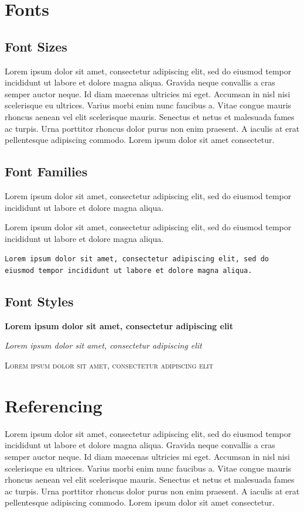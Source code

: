 \documentclass[a4paper, 12pt]{report}
\begin{document}
\chapter{Fonts}
\section{Font Sizes}
Lorem ipsum {\tiny dolor sit amet}, consectetur adipiscing elit, sed do eiusmod tempor incididunt ut labore et dolore magna aliqua. Gravida neque convallis a cras semper auctor neque. Id diam maecenas ultricies mi eget. {\large Accumsan in nisl nisi scelerisque} eu ultrices. Varius morbi enim nunc faucibus a. Vitae congue mauris rhoncus aenean vel elit scelerisque mauris. Senectus et netus et malesuada fames ac turpis. Urna porttitor rhoncus dolor purus non enim praesent. {\huge A iaculis at erat} pellentesque adipiscing commodo. Lorem ipsum dolor sit amet consectetur.

\section{Font Families}
\textrm{Lorem ipsum dolor sit amet, consectetur adipiscing elit, sed do eiusmod tempor incididunt ut labore et dolore magna aliqua.}

\textsf{Lorem ipsum dolor sit amet, consectetur adipiscing elit, sed do eiusmod tempor incididunt ut labore et dolore magna aliqua.}

\texttt{Lorem ipsum dolor sit amet, consectetur adipiscing elit, sed do eiusmod tempor incididunt ut labore et dolore magna aliqua.}

\section{Font Styles}
\textbf{Lorem ipsum dolor sit amet, consectetur adipiscing elit}

\textsl{Lorem ipsum dolor sit amet, consectetur adipiscing elit}

\textsc{Lorem ipsum dolor sit amet, consectetur adipiscing elit}



\chapter{Referencing}
Lorem ipsum dolor sit amet, consectetur adipiscing elit, sed do eiusmod tempor incididunt ut labore et dolore magna aliqua. Gravida neque convallis a cras semper auctor neque. Id diam maecenas ultricies mi eget. Accumsan in nisl nisi scelerisque eu ultrices. Varius morbi enim nunc faucibus a. Vitae congue mauris rhoncus aenean vel elit scelerisque mauris. Senectus et netus et malesuada fames ac turpis. Urna porttitor rhoncus dolor purus non enim praesent. A iaculis at erat pellentesque adipiscing commodo. Lorem ipsum dolor sit amet consectetur. \citep{7458761}
\end{document}

